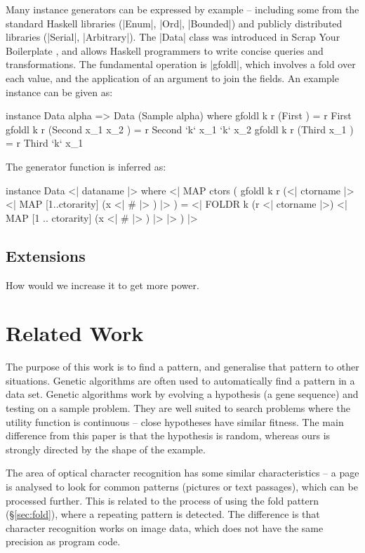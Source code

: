 \documentclass[preprint]{sigplanconf}
\begin{document}
Many instance generators can be expressed by example -- including some from the standard Haskell libraries (|Enum|, |Ord|, |Bounded|) and publicly distributed libraries (|Serial|, |Arbitrary|). The |Data| class was introduced in Scrap Your Boilerplate \cite{lammel:syb}, and allows Haskell programmers to write concise queries and transformations. The fundamental operation is |gfoldl|, which involves a fold over each value, and the application of an argument to join the fields. An example instance can be given as:

\begin{code}
instance Data alpha => Data (Sample alpha) where
    gfoldl k r (First            ) = r First
    gfoldl k r (Second  x_1 x_2  ) = r Second  `k` x_1 `k` x_2
    gfoldl k r (Third   x_1      ) = r Third   `k` x_1
\end{code}

\noindent The generator function is inferred as:

\ignore\begin{code}
instance Data \? <| dataname |> where
    <| MAP ctors (
        gfoldl k r
            (<| ctorname |> \? <| MAP [1..ctorarity] (x <| # |> ) |> ) =
            <| FOLDR k (r \? <| ctorname |>)
                <| MAP [1 .. ctorarity] (x <| # |> ) |>
            |>
    ) |>
\end{code}

\subsection{Extensions}

How would we increase it to get more power.

\section{Related Work}
\label{sec:related}

The purpose of this work is to find a pattern, and generalise that pattern to other situations. Genetic algorithms \cite{genetic_algorithms} are often used to automatically find a pattern in a data set. Genetic algorithms work by evolving a hypothesis (a gene sequence) and testing on a sample problem. They are well suited to search problems where the utility function is continuous -- close hypotheses have similar fitness. The main difference from this paper is that the hypothesis is random, whereas ours is strongly directed by the shape of the example.

The area of optical character recognition \cite{ocr} has some similar characteristics -- a page is analysed to look for common patterns (pictures or text passages), which can be processed further. This is related to the process of using the fold pattern (\S\ref{sec:fold}), where a repeating pattern is detected. The difference is that character recognition works on image data, which does not have the same precision as program code.
\end{document}
